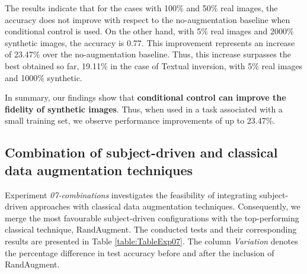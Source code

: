 The results indicate that for the cases with 100\% and 50\% real images, the accuracy does not improve with respect to the no-augmentation baseline when conditional control is used. On the other hand, with 5\% real images and 2000\% synthetic images, the accuracy is 0.77. This improvement represents an increase of 23.47\% over the no-augmentation baseline. Thus, this increase surpasses the best obtained so far, 19.11\% in the case of Textual inversion, with 5\% real images and 1000\% synthetic.

In summary, our findings show that \textbf{conditional control can improve the fidelity of synthetic images}. Thus, when used in a task associated with a small training set, we observe performance improvements of up to 23.47\%.

\subsection{Combination of subject-driven and classical data augmentation techniques} \label{sec: exp-07}

Experiment \textit{07-combinations} investigates the feasibility of integrating subject-driven approaches with classical data augmentation techniques. Consequently, we merge the most favourable subject-driven configurations with the top-performing classical technique, RandAugment. The conducted tests and their corresponding results are presented in Table \ref{table:TableExp07}. The column \textit{Variation} denotes the percentage difference in test accuracy before and after the inclusion of RandAugment.

